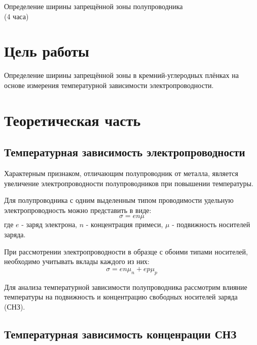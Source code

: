 \newpage

\setcounter{chapter}{2}
\setcounter{section}{0}
\setcounter{figure}{0}
\setcounter{table}{0}
\setcounter{equation}{0}

\begin{center}
Определение ширины запрещённой зоны полупроводника \\
(4 часа)
\end{center}

\section{Цель работы}
Определение ширины запрещённой зоны в кремний-углеродных плёнках на основе измерения температурной зависимости электропроводности.

\section{Теоретическая часть}
\subsection{Температурная зависимость электропроводности}

Характерным признаком, отличающим полупроводник от металла, является увеличение электропроводности полупроводников при повышении температуры.

Для полупроводника с одним выделенным типом проводимости удельную электропроводность можно представить в виде:
\begin{equation}
\sigma = e n \mu
\end{equation}
где $e$ - заряд электрона, $n$ - концентрация примеси, $\mu$ - подвижность носителей заряда.

При рассмотрении электропроводности в образце с обоими типами носителей, необходимо учитывать вклады каждого из них:
\begin{equation}
\sigma = e n \mu_{n} + e p \mu_{p}
\end{equation}

Для анализа температурной зависимости полупроводника рассмотрим влияние температуры на подвижность и концентрацию свободных носителей заряда (СНЗ).

\subsection{Температурная зависимость конценрации СНЗ}

